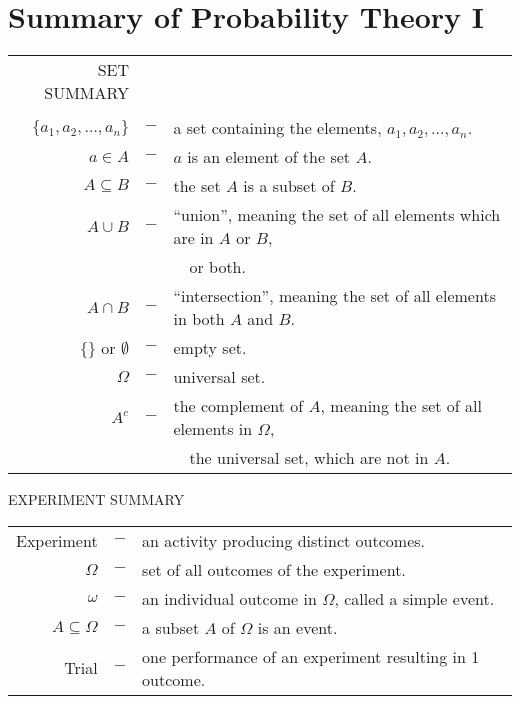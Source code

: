 \newpage
\chapter*{Summary of Probability Theory I}

{\scriptsize

\begin{framed}
\begin{tabular}{rcl}
SET SUMMARY\\ \\
$\{a_1,a_2,\dots,a_n\}$& $-$& a set containing the elements, $a_1,a_2,\dots,a_n$.\\
$a\in A$ &$-$& $a$ is an element of the set $A$.\\
$A\subseteq B$ &$-$& the set $A$ is a subset of $B$.\\
$A\cup B$ &$-$& ``union'', meaning the set of all elements which are in $A$ or $B$, \\
& & \ \ or both.\\
$A\cap B$ &$-$& ``intersection'', meaning the set of all elements in both $A$ and $B$.\\
$\{\}$ or $\emptyset$ &$-$& empty set.\\
$\Omega $ &$-$& universal set.  \\
$A^c $ &$-$& the complement of $A$, meaning the set of all elements in $\Omega$,\\
& & \ \ the universal set, which are not in $A$.\\
\end{tabular}
\end{framed}


\begin{framed}
EXPERIMENT SUMMARY\\

\begin{tabular}{rcl}
Experiment &$-$& an activity producing distinct outcomes.\\
$\Omega$ &$-$& set of all outcomes of the experiment.\\
$\omega$ &$-$& an individual outcome in $\Omega$, called a simple event.\\
$A\subseteq \Omega$ &$-$& a subset $A$ of $\Omega$ is an event.\\
Trial &$-$& one performance of an experiment resulting in 1 outcome.\\
\end{tabular}
\end{framed}

}
